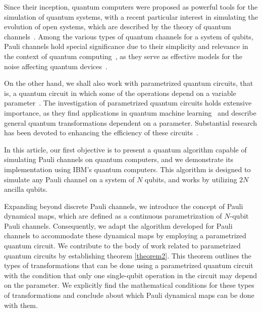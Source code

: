 \documentclass[10pt,letterpaper]{article} %
\begin{document}
Since their inception, quantum computers were proposed as powerful tools for the simulation of quantum systems,
with a recent particular interest in simulating the evolution of open systems, 
which are described by the theory of quantum channels~\cite{cleve,Zanetti,Xin,Wei}. 
Among the various types of quantum channels for a system of qubits, 
Pauli channels hold special significance due to their simplicity 
and relevance in the context of quantum computing~\cite{Zbigniew,geometry}, 
as they serve as effective models for the noise affecting quantum devices~\cite{Flammia,Fawzi}.

On the other hand, we shall also work with parametrized quantum circuits, that is,  
a quantum circuit in which some of the operations depend on a variable parameter~\cite{cerezo}. 
The investigation of parametrized quantum
circuits holds extensive importance, 
as they find applications in quantum machine learning~\cite{Benedetti}
and describe general quantum transformations dependent on a parameter. Substantial research has been 
devoted to enhancing the efficiency of these circuits~\cite{Watanabe,Rasmussen}. 

In this article, our first objective is to present a 
quantum algorithm capable of simulating Pauli channels on quantum computers, 
and we demonstrate its implementation using IBM's quantum computers. 
This algorithm is designed to simulate any Pauli channel on a system of $N$ qubits,
and works by utilizing $2N$ ancilla qubits.

Expanding beyond discrete Pauli channels,
we introduce the concept of Pauli dynamical maps, 
which are defined as a continuous parametrization of
$N$-qubit Pauli channels. 
Consequently, we adapt the algorithm developed for Pauli channels 
to accommodate these dynamical maps by employing a 
parametrized quantum circuit. 
We contribute to the body of work related to parametrized quantum circuits by establishing theorem \ref{theorem2}.
This theorem outlines the types of transformations that 
can be done using a parametrized quantum circuit with the condition that only one
 single-qubit operation in the circuit may depend on the parameter.
We explicitly find the mathematical conditions for these types of
transformations and conclude about which 
Pauli dynamical maps can be done with them. 
\end{document}
